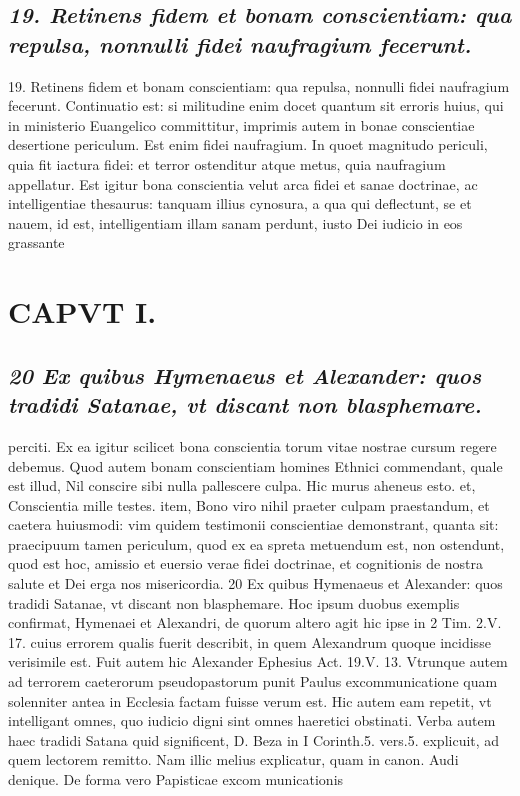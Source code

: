 \documentclass{article}
\begin{document}
\begin{pages}
\subsection*{\textit{19. Retinens fidem et bonam conscientiam: qua repulsa, nonnulli fidei naufragium fecerunt.}}19. Retinens fidem et bonam conscientiam: qua repulsa, nonnulli fidei naufragium fecerunt.  \pend\pstart Continuatio est: si militudine enim docet quantum sit erroris huius, qui in ministerio Euangelico committitur, imprimis autem in bonae conscientiae desertione periculum. Est enim fidei naufragium. In quoet magnitudo periculi, quia fit iactura fidei: et terror ostenditur atque metus, quia naufragium appellatur. Est igitur bona conscientia velut arca fidei et sanae doctrinae, ac intelligentiae thesaurus: tanquam illius cynosura, a qua qui deflectunt, se et nauem, id est, intelligentiam illam sanam perdunt, iusto Dei iudicio in eos grassante  \pend
\section*{CAPVT  I. }
\marginpar{[ p.37 ]}\pstart {}
{}
\subsection*{\textit{20 Ex quibus Hymenaeus et Alexander: quos tradidi Satanae, vt discant non blasphemare.}}perciti. Ex ea igitur scilicet bona conscientia torum vitae nostrae cursum regere debemus. Quod autem bonam conscientiam homines Ethnici commendant, quale est illud, Nil conscire sibi nulla pallescere culpa. Hic murus aheneus esto. et, Conscientia mille testes. item, Bono viro nihil praeter culpam praestandum, et caetera huiusmodi: vim quidem testimonii conscientiae demonstrant, quanta sit: praecipuum tamen periculum, quod ex ea spreta metuendum est, non ostendunt, quod est hoc, amissio et euersio verae fidei doctrinae, et cognitionis de nostra salute et Dei erga nos misericordia. 20 Ex quibus Hymenaeus et Alexander: quos tradidi Satanae, vt discant non blasphemare. Hoc ipsum duobus exemplis confirmat, Hymenaei et Alexandri, de quorum altero agit hic ipse in 2 Tim. 2.V. 17. cuius errorem qualis fuerit describit, in quem Alexandrum quoque incidisse verisimile est. Fuit autem hic Alexander Ephesius Act. 19.V. 13. Vtrunque autem ad terrorem caeterorum pseudopastorum punit Paulus excommunicatione quam solenniter antea in Ecclesia factam fuisse verum est. Hic autem eam repetit, vt intelligant omnes, quo iudicio digni sint omnes haeretici obstinati. Verba autem haec tradidi Satana quid significent, D. Beza in I Corinth.5. vers.5. explicuit, ad quem lectorem remitto. Nam illic melius explicatur, quam in canon. Audi denique. De forma vero Papisticae excom municationis  \pend

\end{pages}
\end{document}
